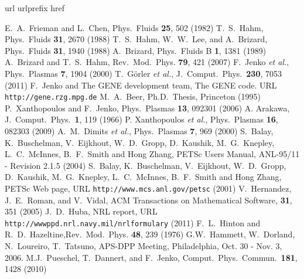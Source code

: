 \documentclass[12pt]{article}
\begin{document}
%
\begin{thebibliography}{99}
\expandafter\ifx\csname url\endcsname\relax
  \def\url#1{\texttt{#1}}\fi
\expandafter\ifx\csname urlprefix\endcsname\relax\def\urlprefix{URL }\fi
\expandafter\ifx\csname href\endcsname\relax
  \def\href#1#2{#2} \def\path#1{#1}\fi

 E.~A.~Frieman and L.~Chen, Phys.~Fluids \textbf{25}, 502 (1982)
 T.~S.~Hahm, Phys.~Fluids \textbf{31}, 2670 (1988)
 T.~S.~Hahm, W.~W.~Lee, and A.~Brizard, Phys.~Fluids \textbf{31}, 1940 (1988)
 A.~Brizard, Phys.~Fluids B \textbf{1}, 1381 (1989)
 A.~Brizard and T.~S.~Hahm, Rev.~Mod.~Phys. \textbf{79}, 421 (2007)
 F.~Jenko {\em et al.}, Phys.~Plasmas \textbf{7}, 1904 (2000)
 T.~G\"orler {\em et al.}, J.~Comput.~Phys.~\textbf{230}, 7053 (2011)
 F.~{Jenko} and {The GENE development team}, \href{http://gene.rzg.mpg.de}{The
  {GENE} code}.
\newline\urlprefix\url{http://gene.rzg.mpg.de}
 M.~A.~Beer, Ph.D.~Thesis, Princeton (1995)
 P.~Xanthopoulos and F.~Jenko, Phys.~Plasmas \textbf{13}, 092301 (2006)
 A. Arakawa, J.~Comput.~Phys.~\textbf{1}, 119 (1966)
 P. Xanthopoulos {\em et al.}, Phys.~Plasmas \textbf{16}, 082303 (2009) 
 A.~M.~Dimits {\em et al.}, Phys.~Plasmas \textbf{7}, 969 (2000)
 S.~Balay, K.~Buschelman, V.~Eijkhout, W.~D.~Gropp, D.~Kaushik, 
  M.~G.~Knepley, L.~C.~McInnes, B.~F.~Smith and Hong Zhang, PETSc Users Manual,
  ANL-95/11 - Revision 2.1.5 (2004)
 S.~Balay, K.~Buschelman, V.~Eijkhout, W.~D.~Gropp, D.~Kaushik,
  M.~G.~Knepley, L.~C.~McInnes, B.~F.~Smith and Hong Zhang, PETSc Web page,
  \urlprefix\url{http://www.mcs.anl.gov/petsc} (2001)
 V.~Hernandez, J.~E.~Roman, and V.~Vidal, ACM Transactions on 
  Mathematical Software, \textbf{31}, 351 (2005)
 J.~D.~Huba, NRL report, \urlprefix\url{http://wwwppd.nrl.navy.mil/nrlformulary} (2011)
 F.~L.~Hinton and R.~D.~Hazeltine,Rev.~Mod.~Phys. \textbf{48}, 239 (1976)
 G.W.~Hammett, W.~Dorland, N.~Loureiro, T.~Tatsuno, APS-DPP Meeting, Philadelphia, Oct. 30 - Nov. 3, 2006. 
 M.J.~Pueschel, T.~Dannert, and F.~Jenko,
Comput.~Phys.~Commun.~\textbf{181}, 1428 (2010)


\end{thebibliography}
\end{document}
